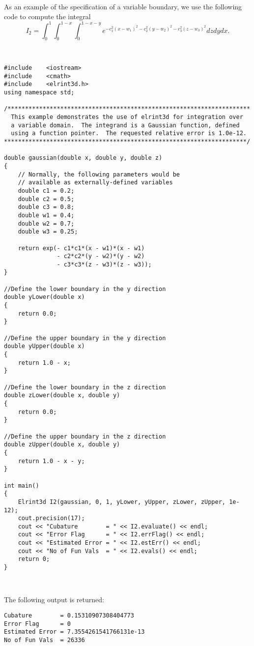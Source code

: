 \documentclass[10pt]{article}
\begin{document}
As an example of the specification of a variable boundary, we use the following code to compute the integral
$$
I_2=\int_0^1\int_0^{1-x}\int_0^{1-x-y}e^{-c_1^2(x-w_1)^2-c_2^2(y-w_2)^2-c_3^2(z-w_3)^2}dzdydx.
$$

\ 

\begin{verbatim}
#include    <iostream>
#include    <cmath>
#include    <elrint3d.h>
using namespace std;

/*********************************************************************
  This example demonstrates the use of elrint3d for integration over 
  a variable domain.  The integrand is a Gaussian function, defined
  using a function pointer.  The requested relative error is 1.0e-12.
*********************************************************************/

double gaussian(double x, double y, double z)
{
    // Normally, the following parameters would be   
    // available as externally-defined variables 
    double c1 = 0.2;
    double c2 = 0.5;
    double c3 = 0.8;
    double w1 = 0.4;
    double w2 = 0.7;
    double w3 = 0.25;
    
    return exp(- c1*c1*(x - w1)*(x - w1)
               - c2*c2*(y - w2)*(y - w2)
               - c3*c3*(z - w3)*(z - w3));
}

//Define the lower boundary in the y direction
double yLower(double x)
{
    return 0.0;
}

//Define the upper boundary in the y direction
double yUpper(double x)
{
    return 1.0 - x;
}

//Define the lower boundary in the z direction
double zLower(double x, double y)
{
    return 0.0;
}

//Define the upper boundary in the z direction
double zUpper(double x, double y)
{
    return 1.0 - x - y;
}

int main()
{
    Elrint3d I2(gaussian, 0, 1, yLower, yUpper, zLower, zUpper, 1e-12);
    cout.precision(17);
    cout << "Cubature        = " << I2.evaluate() << endl;
    cout << "Error Flag      = " << I2.errFlag() << endl;
    cout << "Estimated Error = " << I2.estErr() << endl;
    cout << "No of Fun Vals  = " << I2.evals() << endl;    
    return 0;
}
\end{verbatim}

\ 

\noindent The following output is returned:

\begin{verbatim}
Cubature        = 0.15310907308404773
Error Flag      = 0
Estimated Error = 7.3554261541766131e-13
No of Fun Vals  = 26336
\end{verbatim}
\end{document}
